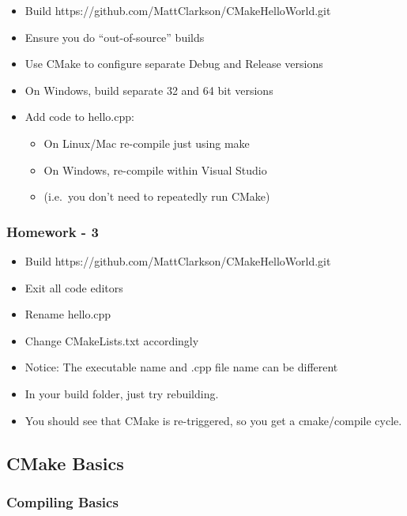 \begin{itemize}
\itemsep1pt\parskip0pt
\item
  Build https://github.com/MattClarkson/CMakeHelloWorld.git
\item
  Ensure you do ``out-of-source'' builds
\item
  Use CMake to configure separate Debug and Release versions
\item
  On Windows, build separate 32 and 64 bit versions
\item
  Add code to hello.cpp:

  \begin{itemize}
  \itemsep1pt\parskip0pt
  \item
    On Linux/Mac re-compile just using make
  \item
    On Windows, re-compile within Visual Studio
  \item
    (i.e.~you don't need to repeatedly run CMake)
  \end{itemize}
\end{itemize}

\subsubsection{Homework - 3}\label{homework---3}

\begin{itemize}
\itemsep1pt\parskip0pt
\item
  Build https://github.com/MattClarkson/CMakeHelloWorld.git
\item
  Exit all code editors
\item
  Rename hello.cpp
\item
  Change CMakeLists.txt accordingly
\item
  Notice: The executable name and .cpp file name can be different
\item
  In your build folder, just try rebuilding.
\item
  You should see that CMake is re-triggered, so you get a cmake/compile
  cycle.
\end{itemize}

\subsection{CMake Basics}\label{cmake-basics}

\subsubsection{Compiling Basics}\label{compiling-basics}

